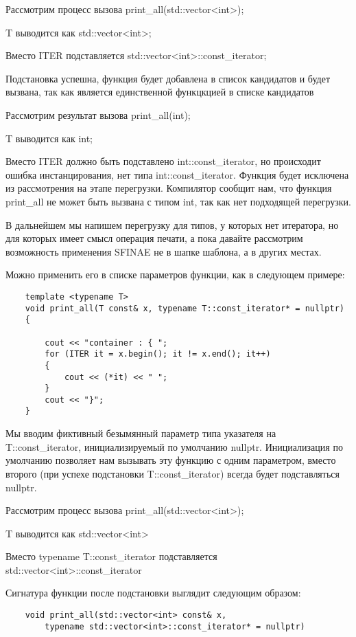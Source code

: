 	Рассмотрим процесс вызова print\_all(std::vector<int>);
	
	T выводится как std::vector<int>;
	
	Вместо ITER подставляется std::vector<int>::const\_iterator;
	
	Подстановка успешна, функция будет добавлена в список кандидатов и будет вызвана, так как является единственной функцкцией в списке кандидатов

	Рассмотрим результат вызова print\_all(int);
	
	T выводится как int;
	
	Вместо ITER должно быть подставлено int::const\_iterator, но происходит ошибка инстанцирования, нет типа int::const\_iterator. Функция будет исключена из рассмотрения на этапе перегрузки. Компилятор сообщит нам, что функция print\_all не может быть вызвана с типом int, так как нет подходящей перегрузки.

	В дальнейшем мы напишем перегрузку для типов, у которых нет итератора, но для которых имеет смысл операция печати, а пока давайте рассмотрим возможность применения SFINAE не в шапке шаблона, а в других местах.

	Можно применить его в списке параметров функции, как в следующем примере:
	
	\begin{verbatim}
	template <typename T>
	void print_all(T const& x, typename T::const_iterator* = nullptr)
	{

	    cout << "container : { ";
	    for (ITER it = x.begin(); it != x.end(); it++)
	    {
	        cout << (*it) << " ";
	    } 
	    cout << "}";
	}
	\end{verbatim}	
	
	Мы вводим фиктивный безымянный параметр типа указателя на T::const\_iterator, инициализируемый по умолчанию nullptr. Инициализация по умолчанию позволяет нам вызывать эту функцию с одним параметром, вместо второго (при успехе подстановки T::const\_iterator) всегда будет подставляться nullptr.
		
	Рассмотрим процесс вызова print\_all(std::vector<int>);
		
	T выводится как std::vector<int>
		
	Вместо typename T::const\_iterator подставляется std::vector<int>::const\_iterator

	Сигнатура функции после подстановки выглядит следующим образом:

	\begin{verbatim}
	void print_all(std::vector<int> const& x, 
	    typename std::vector<int>::const_iterator* = nullptr)
	\end{verbatim}	
	
